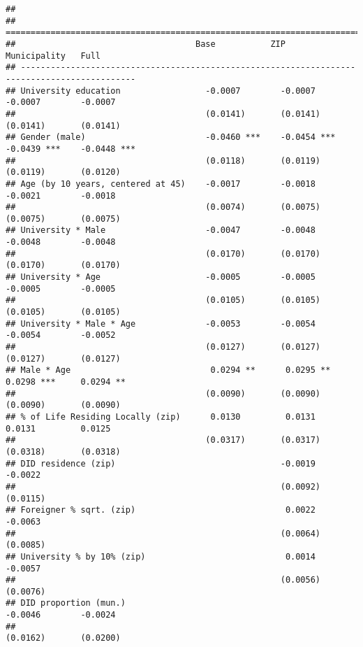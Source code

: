 \documentclass[
]{article}
\begin{document}
\begin{verbatim}
## 
## =============================================================================================
##                                    Base           ZIP            Municipality   Full         
## ---------------------------------------------------------------------------------------------
## University education                 -0.0007        -0.0007        -0.0007        -0.0007    
##                                      (0.0141)       (0.0141)       (0.0141)       (0.0141)   
## Gender (male)                        -0.0460 ***    -0.0454 ***    -0.0439 ***    -0.0448 ***
##                                      (0.0118)       (0.0119)       (0.0119)       (0.0120)   
## Age (by 10 years, centered at 45)    -0.0017        -0.0018        -0.0021        -0.0018    
##                                      (0.0074)       (0.0075)       (0.0075)       (0.0075)   
## University * Male                    -0.0047        -0.0048        -0.0048        -0.0048    
##                                      (0.0170)       (0.0170)       (0.0170)       (0.0170)   
## University * Age                     -0.0005        -0.0005        -0.0005        -0.0005    
##                                      (0.0105)       (0.0105)       (0.0105)       (0.0105)   
## University * Male * Age              -0.0053        -0.0054        -0.0054        -0.0052    
##                                      (0.0127)       (0.0127)       (0.0127)       (0.0127)   
## Male * Age                            0.0294 **      0.0295 **      0.0298 ***     0.0294 ** 
##                                      (0.0090)       (0.0090)       (0.0090)       (0.0090)   
## % of Life Residing Locally (zip)      0.0130         0.0131         0.0131         0.0125    
##                                      (0.0317)       (0.0317)       (0.0318)       (0.0318)   
## DID residence (zip)                                 -0.0019                       -0.0022    
##                                                     (0.0092)                      (0.0115)   
## Foreigner % sqrt. (zip)                              0.0022                       -0.0063    
##                                                     (0.0064)                      (0.0085)   
## University % by 10% (zip)                            0.0014                       -0.0057    
##                                                     (0.0056)                      (0.0076)   
## DID proportion (mun.)                                              -0.0046        -0.0024    
##                                                                    (0.0162)       (0.0200)   

\end{verbatim}
\end{document}
